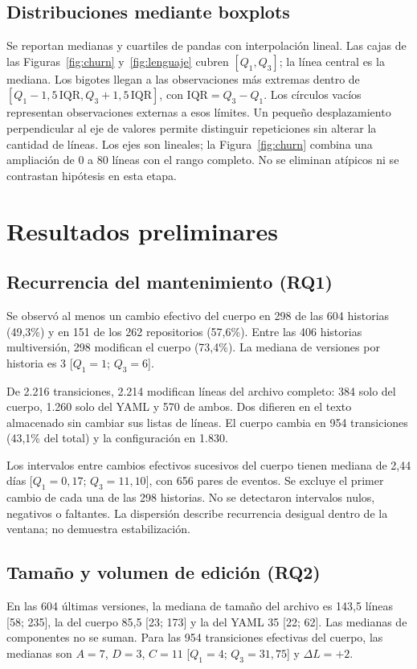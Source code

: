 \documentclass[conference,a4paper]{IEEEtran}
\begin{document}
\subsection{Distribuciones mediante boxplots}
Se reportan medianas y cuartiles de pandas con interpolación lineal. Las cajas de las Figuras~\ref{fig:churn} y~\ref{fig:lenguaje} cubren $[Q_1,Q_3]$; la línea central es la mediana. Los bigotes llegan a las observaciones más extremas dentro de $[Q_1-1{,}5\,\mathrm{IQR},Q_3+1{,}5\,\mathrm{IQR}]$, con $\mathrm{IQR}=Q_3-Q_1$. Los círculos vacíos representan observaciones externas a esos límites. Un pequeño desplazamiento perpendicular al eje de valores permite distinguir repeticiones sin alterar la cantidad de líneas. Los ejes son lineales; la Figura~\ref{fig:churn} combina una ampliación de 0 a 80 líneas con el rango completo. No se eliminan atípicos ni se contrastan hipótesis en esta etapa.

\clearpage
\section{Resultados preliminares}
\subsection{Recurrencia del mantenimiento (RQ1)}
Se observó al menos un cambio efectivo del cuerpo en 298 de las 604 historias (49,3\%) y en 151 de los 262 repositorios (57,6\%). Entre las 406 historias multiversión, 298 modifican el cuerpo (73,4\%). La mediana de versiones por historia es 3 [$Q_1=1$; $Q_3=6$].

De 2.216 transiciones, 2.214 modifican líneas del archivo completo: 384 solo del cuerpo, 1.260 solo del YAML y 570 de ambos. Dos difieren en el texto almacenado sin cambiar sus listas de líneas. El cuerpo cambia en 954 transiciones (43,1\% del total) y la configuración en 1.830.

Los intervalos entre cambios efectivos sucesivos del cuerpo tienen mediana de 2,44 días [$Q_1=0{,}17$; $Q_3=11{,}10$], con 656 pares de eventos. Se excluye el primer cambio de cada una de las 298 historias. No se detectaron intervalos nulos, negativos o faltantes. La dispersión describe recurrencia desigual dentro de la ventana; no demuestra estabilización.

\subsection{Tamaño y volumen de edición (RQ2)}
En las 604 últimas versiones, la mediana de tamaño del archivo es 143,5 líneas [58; 235], la del cuerpo 85,5 [23; 173] y la del YAML 35 [22; 62]. Las medianas de componentes no se suman. Para las 954 transiciones efectivas del cuerpo, las medianas son $A=7$, $D=3$, $C=11$ [$Q_1=4$; $Q_3=31{,}75$] y $\Delta L=+2$.
\end{document}
